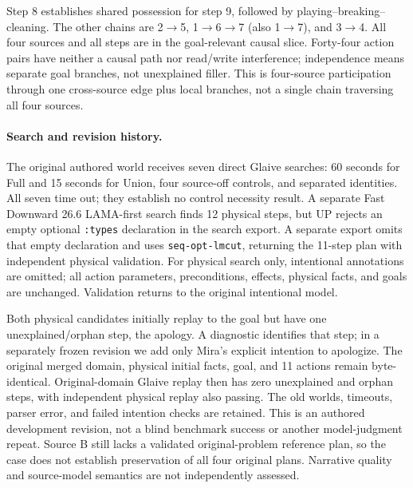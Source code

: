 Step 8 establishes shared possession for step 9, followed by playing--breaking--cleaning. The other chains are 2$\to$5, 1$\to$6$\to$7 (also 1$\to$7), and 3$\to$4. All four sources and all steps are in the goal-relevant causal slice. Forty-four action pairs have neither a causal path nor read/write interference; independence means separate goal branches, not unexplained filler. This is four-source participation through one cross-source edge plus local branches, not a single chain traversing all four sources.

\paragraph{Search and revision history.}
The original authored world receives seven direct Glaive searches: 60 seconds for Full and 15 seconds for Union, four source-off controls, and separated identities. All seven time out; they establish no control necessity result. A separate Fast Downward 26.6 LAMA-first search finds 12 physical steps, but UP rejects an empty optional \texttt{:types} declaration in the search export. A separate export omits that empty declaration and uses \texttt{seq-opt-lmcut}, returning the 11-step plan with independent physical validation. For physical search only, intentional annotations are omitted; all action parameters, preconditions, effects, physical facts, and goals are unchanged. Validation returns to the original intentional model.

Both physical candidates initially replay to the goal but have one unexplained/orphan step, the apology. A diagnostic identifies that step; in a separately frozen revision we add only Mira's explicit intention to apologize. The original merged domain, physical initial facts, goal, and 11 actions remain byte-identical. Original-domain Glaive replay then has zero unexplained and orphan steps, with independent physical replay also passing. The old worlds, timeouts, parser error, and failed intention checks are retained. This is an authored development revision, not a blind benchmark success or another model-judgment repeat. Source B still lacks a validated original-problem reference plan, so the case does not establish preservation of all four original plans. Narrative quality and source-model semantics are not independently assessed.
